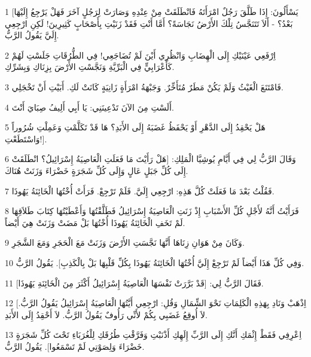 \par 1 [يَسْأَلُونَ: إِذَا طَلَّقَ رَجُلٌ امْرَأَتَهُ فَانْطَلَقَتْ مِنْ عِنْدِهِ وَصَارَتْ لِرَجُلٍ آخَرَ فَهَلْ يَرْجِعُ إِلَيْهَا بَعْدُ؟ - أَلاَ تَتَنَجَّسُ تِلْكَ الأَرْضُ نَجَاسَةً؟ أَمَّا أَنْتِ فَقَدْ زَنَيْتِ بِأَصْحَابٍ كَثِيرِينَ! لَكِنِ ارْجِعِي إِلَيَّ يَقُولُ الرَّبُّ.
\par 2 اِرْفَعِي عَيْنَيْكِ إِلَى الْهِضَابِ وَانْظُرِي أَيْنَ لَمْ تُضَاجَعِي! فِي الطُّرُقَاتِ جَلَسْتِ لَهُمْ كَأَعْرَابِيٍّ فِي الْبَرِّيَّةِ وَنَجَّسْتِ الأَرْضَ بِزِنَاكِ وَبِشَرِّكِ.
\par 3 فَامْتَنَعَ الْغَيْثُ وَلَمْ يَكُنْ مَطَرٌ مُتَأَخِّرٌ. وَجَبْهَةُ امْرَأَةٍ زَانِيَةٍ كَانَتْ لَكِ. أَبَيْتِ أَنْ تَخْجَلِي.
\par 4 أَلَسْتِ مِنَ الآنَ تَدْعِينَنِي: يَا أَبِي أَلِيفُ صِبَايَ أَنْتَ.
\par 5 هَلْ يَحْقِدُ إِلَى الدَّهْرِ أَوْ يَحْفَظُ غَضَبَهُ إِلَى الأَبَدِ؟ هَا قَدْ تَكَلَّمْتِ وَعَمِلْتِ شُرُوراً وَاسْتَطَعْتِ!].
\par 6 وَقَالَ الرَّبُّ لِي فِي أَيَّامِ يُوشِيَّا الْمَلِكِ: [هَلْ رَأَيْتَ مَا فَعَلَتِ الْعَاصِيَةُ إِسْرَائِيلُ؟ انْطَلَقَتْ إِلَى كُلِّ جَبَلٍ عَالٍ وَإِلَى كُلِّ شَجَرَةٍ خَضْرَاءَ وَزَنَتْ هُنَاكَ.
\par 7 فَقُلْتُ بَعْدَ مَا فَعَلَتْ كُلَّ هَذِهِ: ارْجِعِي إِلَيَّ. فَلَمْ تَرْجِعْ. فَرَأَتْ أُخْتُهَا الْخَائِنَةُ يَهُوذَا.
\par 8 فَرَأَيْتُ أَنَّهُ لأَجْلِ كُلِّ الأَسْبَابِ إِذْ زَنَتِ الْعَاصِيَةُ إِسْرَائِيلُ فَطَلَّقْتُهَا وَأَعْطَيْتُهَا كِتَابَ طَلاَقِهَا لَمْ تَخَفِ الْخَائِنَةُ يَهُوذَا أُخْتُهَا بَلْ مَضَتْ وَزَنَتْ هِيَ أَيْضاً.
\par 9 وَكَانَ مِنْ هَوَانِ زِنَاهَا أَنَّهَا نَجَّسَتِ الأَرْضَ وَزَنَتْ مَعَ الْحَجَرِ وَمَعَ الشَّجَرِ.
\par 10 وَفِي كُلِّ هَذَا أَيْضاً لَمْ تَرْجِعْ إِلَيَّ أُخْتُهَا الْخَائِنَةُ يَهُوذَا بِكُلِّ قَلْبِهَا بَلْ بِالْكَذِبِ]. يَقُولُ الرَّبُّ.
\par 11 فَقَالَ الرَّبُّ لِي: [قَدْ بَرَّرَتْ نَفْسَهَا الْعَاصِيَةُ إِسْرَائِيلُ أَكْثَرَ مِنَ الْخَائِنَةِ يَهُوذَا].
\par 12 [اِذْهَبْ وَنَادِ بِهَذِهِ الْكَلِمَاتِ نَحْوَ الشِّمَالِ وَقُلِ: ارْجِعِي أَيَّتُهَا الْعَاصِيَةُ إِسْرَائِيلُ يَقُولُ الرَّبُّ. لاَ أُوقِعُ غَضَبِي بِكُمْ لأَنِّي رَأُوفٌ يَقُولُ الرَّبُّ. لاَ أَحْقِدُ إِلَى الأَبَدِ.
\par 13 اِعْرِفِي فَقَطْ إِثْمَكِ أَنَّكِ إِلَى الرَّبِّ إِلَهِكِ أَذْنَبْتِ وَفَرَّقْتِ طُرُقَكِ لِلْغُرَبَاءِ تَحْتَ كُلِّ شَجَرَةٍ خَضْرَاءَ وَلِصَوْتِي لَمْ تَسْمَعُوا]. يَقُولُ الرَّبُّ.
